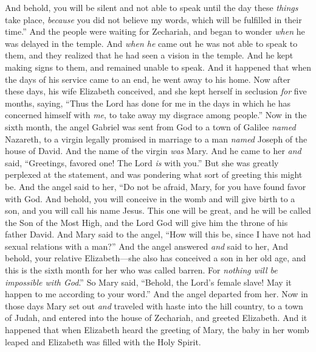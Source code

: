 \begin{biblechapter}
\verse And behold, you will be silent and not able to speak until the day these \textit{things} take place, \textit{because} you did not believe my words, which will be fulfilled in their time.”
\verse And the people were waiting for Zechariah, and began to wonder \textit{when} he was delayed in the temple.
\verse And \textit{when he} came out he was not able to speak to them, and they realized that he had seen a vision in the temple. And he kept making signs to them, and remained unable to speak.
\verse And it happened that when the days of his service came to an end, he went away to his home.
\verse Now after these days, his wife Elizabeth conceived, and she kept herself in seclusion \textit{for} five months, saying,
\verse “Thus the Lord has done for me in the days in which he has concerned himself with \textit{me}, to take away my disgrace among people.”
 Now in the sixth month, the angel Gabriel was sent from God to a town of Galilee \textit{named} Nazareth,
\verse to a virgin legally promised in marriage to a man \textit{named} Joseph of the house of David. And the name of the virgin \textit{was} Mary.
\verse And he came to her \textit{and} said, “Greetings, favored one! The Lord \textit{is} with you.”
\verse But she was greatly perplexed at the statement, and was pondering what sort of greeting this might be.
\verse And the angel said to her,
\verse “Do not be afraid, Mary, for you have found favor with God.
\verse And behold, you will conceive in the womb and will give birth to a son, 
and you will call his name Jesus.
\verse This one will be great, and he will be called the Son of the Most High, 
and the Lord God will give him the throne of his father David.
\verse And Mary said to the angel, “How will this be, since I have not had sexual relations with a man?”
\verse And the angel answered \textit{and} said to her,
\verse And behold, your relative Elizabeth—she also has conceived a son in her old age, and this is the sixth month for her who was called barren.
\verse For \textit{nothing will be impossible with God}.”
\verse So Mary said, “Behold, the Lord’s female slave! May it happen to me according to your word.” And the angel departed from her.
 Now in those days Mary set out \textit{and} traveled with haste into the hill country, to a town of Judah,
\verse and entered into the house of Zechariah, and greeted Elizabeth.
\verse And it happened that when Elizabeth heard the greeting of Mary, the baby in her womb leaped and Elizabeth was filled with the Holy Spirit.

\end{biblechapter}

